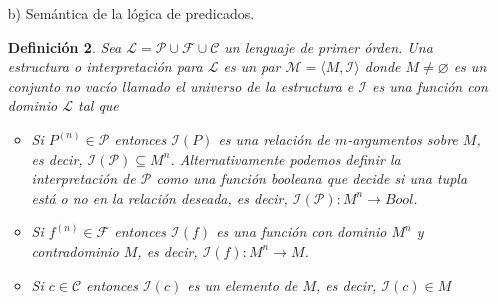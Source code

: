 \documentclass[letterpaper,11pt]{article}
\newtheorem{teo}{Definición}[]
\begin{document}
\begin{enumerate}
\begin{itemize}
\begin{teo}
            \end{teo}

            Es decir, la sintaxis de la lógica de predicados en forma de Backus 
            Naur se define como:
            \begin{center}
                $\varphi :: P(t_{1}, ..., t_{n})$ $|$ $\neg \varphi$ $|$ 
                $\varphi \land \varphi$ $|$ $\varphi \lor \varphi$ $|$ 
                $\varphi \rightarrow \varphi$ $|$ $\varphi \leftrightarrow 
                \varphi$ $|$ $\forall x \varphi$ $|$ $\exists x \varphi$ $|$
                $t_{1} = t_{2}$ $|$ $\bot$ $|$ $\top$
            \end{center}

            \item[b)] Semántica de la lógica de predicados.
            \begin{teo}
                Sea $\mathcal{L} = \mathcal{P} \cup \mathcal{F} \cup 
                \mathcal{C}$ un lenguaje de primer órden. Una estructura o 
                interpretación para $\mathcal{L}$ es un par 
                $\mathcal{M} = \langle M, \mathcal{I} \rangle$ donde 
                $M \neq \varnothing$ es un conjunto no vacío llamado el 
                universo de la estructura e $\mathcal{I}$ es una función con
                dominio $\mathcal{L}$ tal que 
                \begin{itemize}
                    \item Si $P^{(n)} \in \mathcal{P}$ entonces 
                    $\mathcal{I}(P)$ es una relación de $m$-argumentos sobre 
                    $M$, es decir, $\mathcal{I}(\mathcal{P}) \subseteq M^{n}$.
                    Alternativamente podemos definir la interpretación de 
                    $\mathcal{P}$ como una función booleana que decide si una 
                    tupla está o no en la relación deseada, es decir, 
                    $\mathcal{I}(\mathcal{P}): M^{n} \rightarrow Bool$.

                    \item Si $f^{(n)} \in \mathcal{F}$ entonces 
                    $\mathcal{I}(f)$ es una función con dominio 
                    $M^{n}$ y contradominio $M$, es decir, 
                    $\mathcal{I}(f): M^{n} \rightarrow M$.
                    \item Si $c \in \mathcal{C}$ entonces $\mathcal{I}(c)$
                    es un elemento de $M$, es decir, $\mathcal{I}(c) \in M$
                \end{itemize}
                

\end{teo}
\end{itemize}
\end{enumerate}
\end{document}
